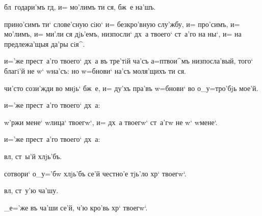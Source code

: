бл~годари'мъ гд, и= мо'лимъ ти ся, бж~е на'шъ.


 прино'симъ ти` слове'сную сiю` и= безкро'вную 
слу'жбу, и= про'симъ, и= мо'лимъ, и= ми'ли ся дjь'емъ, 
низпосли` дх~а твоего` ст~а'го на ны`, и= на предлежа'щыя 
да'ры сiя^.


 и='же прест~а'го твоего` дх~а въ тре'тiй ча'съ 
а=п твои^мъ низпосла'вый, того` благi'й не w` 
w\т на'съ: но w=бнови` на'съ моля'щихъ ти ся.

  чи'сто сози'жди во мнjь` бж~е, и= 
ду'хъ пра'въ w=бнови` во о_у=тро'бjь мое'й.

  и='же прест~а'го твоего` дх~а:

  w'ржи мене` w\т лица` твоегw`, и= дх~а 
твоегw` ст~а'гw не w` w\т мене`.

   и='же прест~а'го твоего` дх~а:


 вл, ст~ы'й хлjь'бъ.


 сотвори` о_у='бw хлjь'бъ се'й честно'е тjь'ло 
хр` твоегw`.

 


 вл, ст~у'ю ча'шу.


 _е='же въ ча'ши се'й, ч'ю кро'вь хр` 
твоегw`.

 


